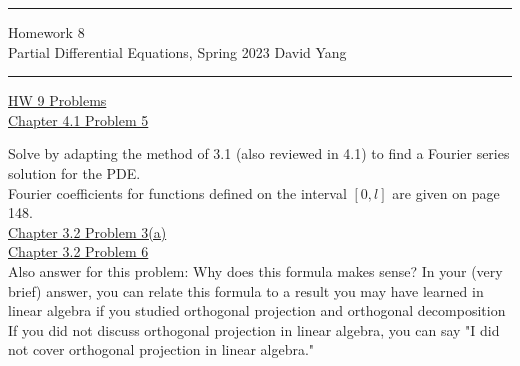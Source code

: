 \documentclass[11pt]{article}
\begin{document}
	\hrule
	\begin{center}
		{\Large Homework 8} \\ %
		\vspace{0.2cm}
		Partial Differential Equations, Spring 2023 \hfill David Yang %
	\end{center}

\hrule

\vspace{1em}


\underline{HW 9 Problems} \\

\underline{Chapter 4.1 Problem 5}

Solve by adapting the method of 3.1 (also reviewed in 4.1) to find a Fourier series solution for the PDE. \\

Fourier coefficients for functions defined on the interval $[0, l]$ are given on page 148. \\

\underline{Chapter 3.2 Problem 3(a)} \\


\underline{Chapter 3.2 Problem 6} \\

Also answer for this problem: Why does this formula makes sense?
In your (very brief) answer, you can relate this formula to a result you may have learned
in linear algebra if you studied orthogonal projection and orthogonal decomposition
If you did not discuss orthogonal projection in linear algebra, you can say "I did not
cover orthogonal projection in linear algebra."
\end{document}
